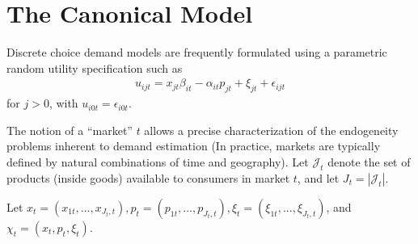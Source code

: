 \documentclass[11pt]{elegantbook}
\begin{document}
\section{The Canonical Model}
\begin{definition}
    Discrete choice demand models are frequently formulated using a parametric random utility specification such as
    \begin{equation}
        \begin{aligned}
            u_{ijt}=x_{jt}\beta_{it}-\alpha_{it}p_{jt}+\xi_{jt}+\epsilon_{ijt}
        \end{aligned}
        \nonumber
    \end{equation}
    for $j>0$, with $u_{i0t}=\epsilon_{i0t}$.
\end{definition}

The notion of a “market” $t$ allows a precise characterization of the endogeneity problems inherent to demand estimation (In practice, markets are typically defined by natural combinations of time and geography). Let $\mathcal{J}_t$ denote the set of products (inside goods) available to consumers in market $t$, and let $J_t=|\mathcal{J}_t|$.

Let $x_t=(x_{1t},...,x_{J_t,t}), p_t=(p_{1t},...,p_{J_t,t}), \xi_t=(\xi_{1t},..., \xi_{J_t,t})$, and $\chi_t=(x_t,p_t,\xi_t)$.
\end{document}
